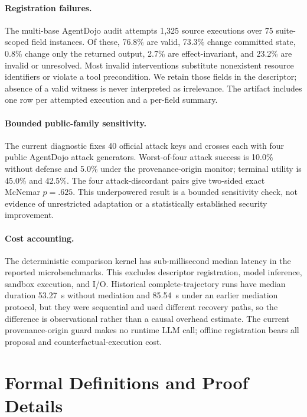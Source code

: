 \documentclass[letterpaper,twocolumn,10pt]{article}
\theoremstyle{definition}
\begin{document}
\paragraph{Registration failures.}
The multi-base AgentDojo audit attempts 1,325 source executions over 75
suite-scoped field instances.  Of these, 76.8\% are valid, 73.3\% change
committed state, 0.8\% change only the returned output, 2.7\% are
effect-invariant, and 23.2\% are invalid or unresolved.  Most invalid interventions substitute nonexistent resource
identifiers or violate a tool precondition.  We retain those fields in the
descriptor; absence of a valid witness is never interpreted as irrelevance.
The artifact includes one row per attempted execution and a per-field summary.

\paragraph{Bounded public-family sensitivity.}
The current diagnostic fixes 40 official attack keys and crosses each with
four public AgentDojo attack generators.  Worst-of-four attack success is
10.0\% without defense and 5.0\% under the provenance-origin monitor; terminal
utility is 45.0\% and 42.5\%.  The four attack-discordant pairs give two-sided
exact McNemar $p=.625$.  This underpowered result is a bounded sensitivity
check, not evidence of unrestricted adaptation or a statistically established
security improvement.

\paragraph{Cost accounting.}
The deterministic comparison kernel has sub-millisecond median latency in the
reported microbenchmarks.  This excludes descriptor registration, model
inference, sandbox execution, and I/O.  Historical complete-trajectory runs
have median duration 53.27~s without mediation and 85.54~s under an earlier
mediation protocol, but they were sequential and used different recovery paths,
so the difference is observational rather than a causal overhead estimate.  The
current provenance-origin guard makes no runtime LLM call; offline registration
bears all proposal and counterfactual-execution cost.

\section{Formal Definitions and Proof Details}
\label{app:formal-proofs}
\end{document}
